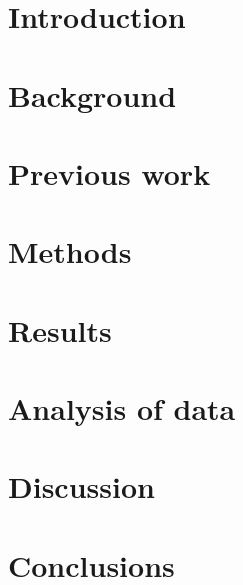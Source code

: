 \documentclass[a4paper, 12pt, openany]{book} %
\begin{document}
\chapter{Introduction}

\cleardoublepage


\chapter{Background}

\cleardoublepage



\chapter{Previous work}

\cleardoublepage



\chapter{Methods}

\cleardoublepage


\chapter{Results}

\cleardoublepage


\chapter{Analysis of data}

\cleardoublepage

\chapter{Discussion}

\cleardoublepage

\chapter{Conclusions}

\cleardoublepage


\printbibliography[title={References}] %
\cleardoublepage
\end{document}
